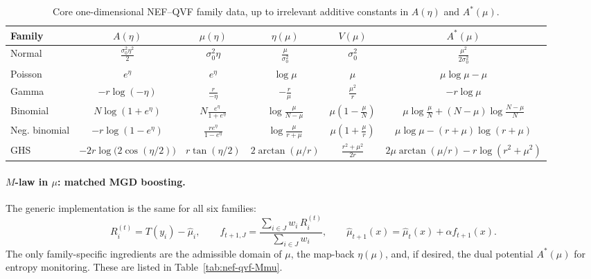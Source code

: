 \documentclass[11pt]{article}
\begin{document}
\begin{table}[t]
\centering
\renewcommand{\arraystretch}{1.3}
\setlength{\tabcolsep}{4.5pt}
\begin{tabular}{lccccc}
\hline
Family & \(A(\eta)\) & \(\mu(\eta)\) & \(\eta(\mu)\) & \(V(\mu)\) & \(A^\ast(\mu)\) \\
\hline
Normal
&
\(\displaystyle \frac{\sigma_0^2\eta^2}{2}\)
&
\(\displaystyle \sigma_0^2\eta\)
&
\(\displaystyle \frac{\mu}{\sigma_0^2}\)
&
\(\displaystyle \sigma_0^2\)
&
\(\displaystyle \frac{\mu^2}{2\sigma_0^2}\)
\\[1.2ex]

Poisson
&
\(\displaystyle e^\eta\)
&
\(\displaystyle e^\eta\)
&
\(\displaystyle \log\mu\)
&
\(\displaystyle \mu\)
&
\(\displaystyle \mu\log\mu-\mu\)
\\[1.2ex]

Gamma
&
\(\displaystyle -r\log(-\eta)\)
&
\(\displaystyle \frac{r}{-\eta}\)
&
\(\displaystyle -\frac{r}{\mu}\)
&
\(\displaystyle \frac{\mu^2}{r}\)
&
\(\displaystyle -r\log\mu\)
\\[1.2ex]

Binomial
&
\(\displaystyle N\log(1+e^\eta)\)
&
\(\displaystyle N\frac{e^\eta}{1+e^\eta}\)
&
\(\displaystyle \log\frac{\mu}{N-\mu}\)
&
\(\displaystyle \mu\left(1-\frac{\mu}{N}\right)\)
&
\(\displaystyle \mu\log\frac{\mu}{N}+(N-\mu)\log\frac{N-\mu}{N}\)
\\[1.2ex]

Neg. binomial
&
\(\displaystyle -r\log(1-e^\eta)\)
&
\(\displaystyle \frac{re^\eta}{1-e^\eta}\)
&
\(\displaystyle \log\frac{\mu}{r+\mu}\)
&
\(\displaystyle \mu\left(1+\frac{\mu}{r}\right)\)
&
\(\displaystyle \mu\log\mu-(r+\mu)\log(r+\mu)\)
\\[1.2ex]

GHS
&
\(\displaystyle -2r\log\!\bigl(2\cos(\eta/2)\bigr)\)
&
\(\displaystyle r\tan(\eta/2)\)
&
\(\displaystyle 2\arctan(\mu/r)\)
&
\(\displaystyle \frac{r^2+\mu^2}{2r}\)
&
\(\displaystyle 2\mu\arctan(\mu/r)-r\log(r^2+\mu^2)\)
\\[1.2ex]
\hline
\end{tabular}
\caption{Core one-dimensional NEF--QVF family data, up to irrelevant additive constants in \(A(\eta)\) and \(A^\ast(\mu)\).}
\label{tab:nef-qvf-family-data}
\end{table}

\paragraph{\(M\)-law in \(\mu\): matched MGD boosting.}
The generic implementation is the same for all six families:
\[
R_i^{(t)}=T(y_i)-\hat\mu_i,
\qquad
f_{t+1,J}=\frac{\sum_{i\in J}w_i\,R_i^{(t)}}{\sum_{i\in J}w_i},
\qquad
\hat\mu_{t+1}(x)=\hat\mu_t(x)+\alpha f_{t+1}(x).
\]
The only family-specific ingredients are the admissible domain of \(\mu\), the map-back \(\eta(\mu)\), and, if desired, the dual potential \(A^\ast(\mu)\) for entropy monitoring. These are listed in Table~\ref{tab:nef-qvf-Mmu}.
\end{document}
